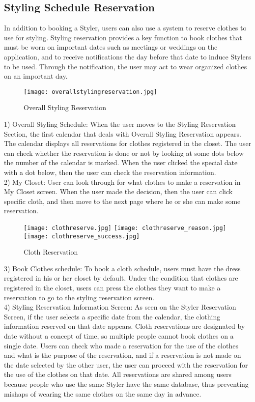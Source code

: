 \documentclass[conference]{IEEEtran}
\begin{document}
\subsection{Styling Schedule Reservation}
In addition to booking a Styler, users can also use a system to reserve clothes to use for styling. Styling reservation provides a key function to book clothes that must be worn on important dates such as meetings or weddings on the application, and to receive notifications the day before that date to induce Stylers to be used. Through the notification, the user may act to wear organized clothes on an important day.\\

\begin{figure}[htbp]
\centerline{\texttt{[image: overallstylingreservation.jpg]}}
\label{fig}
\caption{Overall Styling Reservation}
\end{figure}
1) Overall Styling Schedule: When the user moves to the Styling Reservation Section, the first calendar that deals with Overall Styling Reservation appears. The calendar displays all reservations for clothes registered in the closet. The user can check whether the reservation is done or not by looking at some dots below the number of the calendar is marked. When the user clicked the special date with a dot below, then the user can check the reservation information.\\

2) My Closet: User can look through for what clothes to make a reservation in My Closet screen. When the user made the decision, then the user can click specific cloth, and then move to the next page where he or she can make some reservation.\\

\newpage
\begin{figure}[htbp]
\centerline{
\texttt{[image: clothreserve.jpg]}
\texttt{[image: clothreserve\_reason.jpg]}
\texttt{[image: clothreserve\_success.jpg]}
}
\label{fig}
\caption{Cloth Reservation}
\end{figure}
3) Book Clothes schedule: To book a cloth schedule, users must have the dress registered in his or her closet by default. Under the condition that clothes are registered in the closet, users can press the clothes they want to make a reservation to go to the styling reservation screen.\\

4) Styling Reservation Information Screen: As seen on the Styler Reservation Screen, if the user selects a specific date from the calendar, the clothing information reserved on that date appears.
Cloth reservations are designated by date without a concept of time, so multiple people cannot book clothes on a single date. Users can check who made a reservation for the use of the clothes and what is the purpose of the reservation, and if a reservation is not made on the date selected by the other user, the user can proceed with the reservation for the use of the clothes on that date. 
All reservations are shared among users because people who use the same Styler have the same database, thus preventing mishaps of wearing the same clothes on the same day in advance.\\
\end{document}

